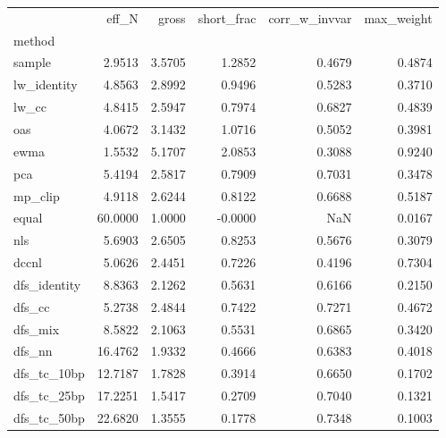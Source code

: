 \begin{tabular}{lrrrrr}
\toprule
 & eff_N & gross & short_frac & corr_w_invvar & max_weight \\
method &  &  &  &  &  \\
\midrule
sample & 2.9513 & 3.5705 & 1.2852 & 0.4679 & 0.4874 \\
lw_identity & 4.8563 & 2.8992 & 0.9496 & 0.5283 & 0.3710 \\
lw_cc & 4.8415 & 2.5947 & 0.7974 & 0.6827 & 0.4839 \\
oas & 4.0672 & 3.1432 & 1.0716 & 0.5052 & 0.3981 \\
ewma & 1.5532 & 5.1707 & 2.0853 & 0.3088 & 0.9240 \\
pca & 5.4194 & 2.5817 & 0.7909 & 0.7031 & 0.3478 \\
mp_clip & 4.9118 & 2.6244 & 0.8122 & 0.6688 & 0.5187 \\
equal & 60.0000 & 1.0000 & -0.0000 & NaN & 0.0167 \\
nls & 5.6903 & 2.6505 & 0.8253 & 0.5676 & 0.3079 \\
dccnl & 5.0626 & 2.4451 & 0.7226 & 0.4196 & 0.7304 \\
dfs_identity & 8.8363 & 2.1262 & 0.5631 & 0.6166 & 0.2150 \\
dfs_cc & 5.2738 & 2.4844 & 0.7422 & 0.7271 & 0.4672 \\
dfs_mix & 8.5822 & 2.1063 & 0.5531 & 0.6865 & 0.3420 \\
dfs_nn & 16.4762 & 1.9332 & 0.4666 & 0.6383 & 0.4018 \\
dfs_tc_10bp & 12.7187 & 1.7828 & 0.3914 & 0.6650 & 0.1702 \\
dfs_tc_25bp & 17.2251 & 1.5417 & 0.2709 & 0.7040 & 0.1321 \\
dfs_tc_50bp & 22.6820 & 1.3555 & 0.1778 & 0.7348 & 0.1003 \\
\bottomrule
\end{tabular}
